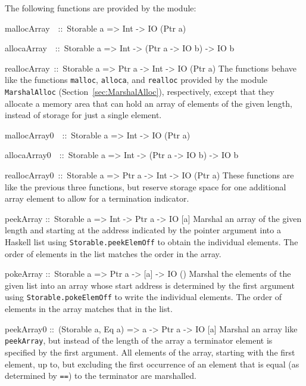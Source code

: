 \documentclass[a4paper,twoside]{article}
\makeatletter
\newcommand{\code}[1]{\texttt{#1}}      %
\newenvironment{codedesc}{%
  \list{}{\labelwidth\z@
    \let\makelabel\codedesclabel}
  }{%
  \endlist
  }
\newcommand*{\codedesclabel}[1]{%
  \hspace{-\leftmargin}
  \parbox[b]{\labelwidth}{\makebox[0pt][l]{\code{#1}}\\}\hfil\relax
  }
\newcommand{\combineitems}{\vspace*{-\itemsep}\vspace*{-\parsep}\vspace*{-1em}}
\makeatother
\begin{document}
The following functions are provided by the module:
%
\begin{codedesc}
\item[mallocArray~~::\ Storable a => Int -> IO (Ptr a)]
\item[allocaArray~~::\ Storable a => Int -> (Ptr a -> IO b) -> IO b]
  \combineitems
\item[reallocArray~::\ Storable a => Ptr a -> Int -> IO (Ptr a)]\combineitems
  The functions behave like the functions \code{malloc}, \code{alloca}, and
  \code{realloc} provided by the module \code{MarshalAlloc}
  (Section~\ref{sec:MarshalAlloc}), respectively, except that they allocate a
  memory area that can hold an array of elements of the given length, instead
  of storage for just a single element.

\item[mallocArray0~~::\ Storable a => Int -> IO (Ptr a)]
\item[allocaArray0~~::\ Storable a => Int -> (Ptr a -> IO b) -> IO b]\combineitems
\item[reallocArray0~::\ Storable a => Ptr a -> Int -> IO (Ptr a)]\combineitems
  These functions are like the previous three functions, but reserve storage
  space for one additional array element to allow for a termination indicator.
  
\item[peekArray ::\ Storable a => Int -> Ptr a -> IO {[a]}] Marshal an array of
  the given length and starting at the address indicated by the pointer
  argument into a Haskell list using \code{Storable.peekElemOff} to obtain the
  individual elements.  The order of elements in the list matches the order in
  the array.
  
\item[pokeArray ::\ Storable a => Ptr a -> {[a]} -> IO ()] Marshal the elements
  of the given list into an array whose start address is determined by the
  first argument using \code{Storable.pokeElemOff} to write the individual
  elements.  The order of elements in the array matches that in the list.
  
\item[peekArray0 ::\ (Storable a, Eq a) => a -> Ptr a -> IO {[a]}] Marshal an
  array like \code{peekArray}, but instead of the length of the array a
  terminator element is specified by the first argument.  All elements of the
  array, starting with the first element, up to, but excluding the first
  occurrence of an element that is equal (as determined by \code{==}) to the
  terminator are marshalled.


\end{codedesc}
\end{document}
